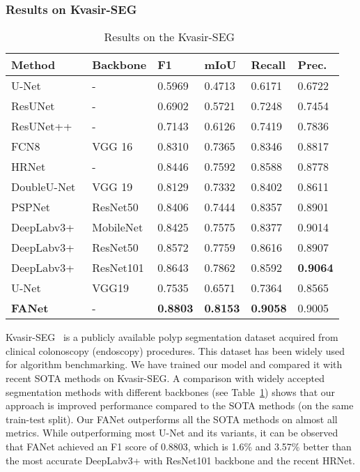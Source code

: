 \documentclass[journal]{IEEEtran}
\begin{document}
\subsubsection{Results on Kvasir-SEG} 
\begin{table}[!t]
\footnotesize
\caption{Results on the Kvasir-SEG~\cite{jha2020kvasir}}
\vspace{0.1cm}
\begin{tabular}{@{}l|l|l|l|l|l@{}}
\toprule
\textbf{Method} &\textbf{Backbone} &\textbf{F1} &\textbf{mIoU} &\textbf{Recall}& \textbf{Prec.} \\ 
\hline
\hline
{U-Net}~\cite{ronneberger2015u} & - & 0.5969 & 0.4713 & 0.6171 & 0.6722 \\ ResUNet~\cite{zhang2018road} & - & 0.6902 & 0.5721 & 0.7248 & 0.7454 \\ {ResUNet++}~\cite{jha2019resunet++} & - & 0.7143 & 0.6126 & 0.7419 & 0.7836 \\{FCN8}~\cite{long2015fully}  &  VGG 16 & 0.8310 & 0.7365 & 0.8346 & 0.8817 \\HRNet~\cite{wang2020deep}& - & 0.8446 & 0.7592 & 0.8588 & 0.8778 \\ {DoubleU-Net}~\cite{jha2020doubleu} & VGG 19 & 0.8129 & 0.7332 & 0.8402 & 0.8611 \\ {PSPNet}~\cite{zhao2017pyramid}  & ResNet50 & 0.8406 & 0.7444 & 0.8357 & 0.8901 \\ DeepLabv3+~\cite{chen2018encoder} & MobileNet & 0.8425 & 0.7575 & 0.8377 & 0.9014 \\ {DeepLabv3+}~\cite{chen2018encoder} & ResNet50 & 0.8572 & 0.7759 & 0.8616 & 0.8907 \\ {DeepLabv3+}~\cite{chen2018encoder}& ResNet101 & 0.8643 & 0.7862 & 0.8592 & \textbf{0.9064} \\ 
U-Net~\cite{ronneberger2015u} & VGG19 & 0.7535 & 0.6571 & 0.7364 & 0.8565 \\ \textbf{FANet} & - & \textbf{0.8803} & \textbf{0.8153} & \textbf{0.9058} & 0.9005 \\ 
\bottomrule
\end{tabular}
\label{tab:kvasirseg}
\end{table}

Kvasir-SEG~\cite{jha2020kvasir} is a publicly available polyp segmentation dataset acquired from clinical colonoscopy (endoscopy) procedures. This dataset has been widely used for algorithm benchmarking. We have trained our model and compared it with recent \ac{SOTA} methods on Kvasir-SEG. A comparison with widely accepted segmentation methods with different backbones (see Table~\ref{tab:kvasirseg}) shows that our approach is improved performance compared to the \ac{SOTA} methods (on the same train-test split). Our FANet outperforms all the \ac{SOTA} methods on almost all metrics. While outperforming most U-Net and its variants, it can be observed that FANet achieved an F1 score of 0.8803, which is 1.6\% and 3.57\% better than the most accurate DeepLabv3+ with ResNet101 backbone and the recent HRNet. 
\end{document}
